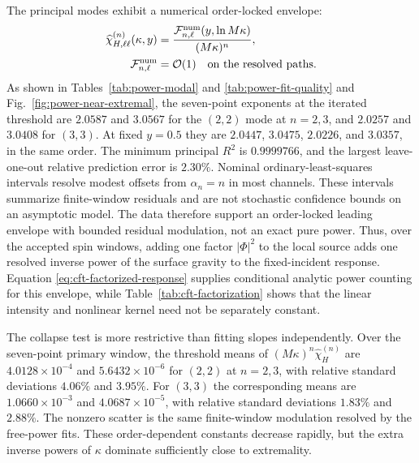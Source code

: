 \documentclass[aps,prd,twocolumn,10pt,nofootinbib,superscriptaddress,floatfix]{revtex4-2}
\newcommand{\calO}{\mathcal{O}}
\begin{document}
The principal modes exhibit a numerical order-locked envelope:
\begin{equation}
 \begin{aligned}
 \widehat\chi_{H,\ell\ell}^{(n)}(\kappa,y)
 &=\frac{{\cal F}^{\rm num}_{n,\ell}(y,\ln M\kappa)}{(M\kappa)^n},\\
 {\cal F}^{\rm num}_{n,\ell}&=\calO(1)
 \quad\hbox{on the resolved paths}.
 \end{aligned}
 \label{eq:power-order-locking}
\end{equation}
As shown in Tables~\ref{tab:power-modal} and \ref{tab:power-fit-quality} and
Fig.~\ref{fig:power-near-extremal}, the seven-point exponents at the iterated
threshold are $2.0587$ and $3.0567$ for the $(2,2)$ mode at $n=2,3$, and
$2.0257$ and $3.0408$ for $(3,3)$.  At fixed $y=0.5$ they are $2.0447$,
$3.0475$, $2.0226$, and $3.0357$, in the same order.  The minimum principal
$R^2$ is $0.9999766$, and the largest leave-one-out relative prediction error
is $2.30\%$.  Nominal ordinary-least-squares intervals resolve modest offsets
from $\alpha_n=n$ in most channels.  These intervals summarize finite-window
residuals and are not stochastic confidence bounds on an asymptotic model.
The data therefore support an order-locked leading
envelope with bounded residual modulation, not an exact pure power.  Thus,
over the accepted spin windows, adding one factor
$|\Phi|^2$ to the local source adds one resolved inverse power of the surface
gravity to the fixed-incident response.  Equation
\eqref{eq:cft-factorized-response} supplies conditional analytic power
counting for this envelope, while Table~\ref{tab:cft-factorization} shows that
the linear intensity and nonlinear kernel need not be separately constant.

The collapse test is more restrictive than fitting slopes independently.
Over the seven-point primary window, the threshold means of
$(M\kappa)^n\widehat\chi_H^{(n)}$ are
$4.0128\times10^{-4}$ and $5.6432\times10^{-6}$ for $(2,2)$ at $n=2,3$,
with relative standard deviations $4.06\%$ and $3.95\%$.  For $(3,3)$ the
corresponding means are $1.0660\times10^{-3}$ and
$4.0687\times10^{-5}$, with relative standard deviations $1.83\%$ and
$2.88\%$.  The nonzero scatter is the same finite-window modulation resolved
by the free-power fits.  These order-dependent constants decrease rapidly, but the extra
inverse powers of $\kappa$ dominate sufficiently close to extremality.
\end{document}
